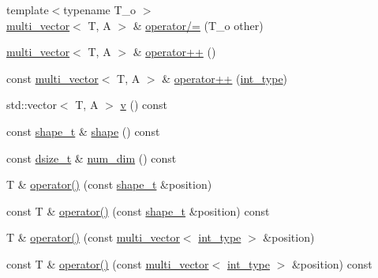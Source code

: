 \begin{DoxyCompactItemize}
\item 
{\footnotesize template$<$typename T\+\_\+o $>$ }\\\hyperlink{classIceBRG_1_1multi__vector}{multi\+\_\+vector}$<$ T, A $>$ \& \hyperlink{classIceBRG_1_1multi__vector_aef3fb151f960eff2cd162b9986229c46}{operator/=} (T\+\_\+o other)
\item 
\hyperlink{classIceBRG_1_1multi__vector}{multi\+\_\+vector}$<$ T, A $>$ \& \hyperlink{classIceBRG_1_1multi__vector_a472689a6e3130c24d066c314bf6a8409}{operator++} ()
\item 
const \hyperlink{classIceBRG_1_1multi__vector}{multi\+\_\+vector}$<$ T, A $>$ \& \hyperlink{classIceBRG_1_1multi__vector_adc1298f6bfb1b3d47bb6cb23230ca527}{operator++} (\hyperlink{lib_2IceBRG__main_2common_8h_ac4de9d9335536ac22821171deec8d39e}{int\+\_\+type})
\item 
std\+::vector$<$ T, A $>$ \hyperlink{classIceBRG_1_1multi__vector_a91f5eebc48c8849b8c27e7992e17701b}{v} () const 
\item 
const \hyperlink{classIceBRG_1_1multi__vector_a468a7f934274e7aa75e01c94ac58f3ea}{shape\+\_\+t} \& \hyperlink{classIceBRG_1_1multi__vector_ad5fb113982dce9456f724ca9072e42c9}{shape} () const 
\item 
const \hyperlink{classIceBRG_1_1multi__vector_af2666369daa5e69abfbadbe365c200e9}{dsize\+\_\+t} \& \hyperlink{classIceBRG_1_1multi__vector_a0beaee05722b4fd40af1452d452f4fe7}{num\+\_\+dim} () const 
\item 
T \& \hyperlink{classIceBRG_1_1multi__vector_a58de7745b168b4831cb1f0b20d933684}{operator()} (const \hyperlink{classIceBRG_1_1multi__vector_a468a7f934274e7aa75e01c94ac58f3ea}{shape\+\_\+t} \&position)
\item 
const T \& \hyperlink{classIceBRG_1_1multi__vector_a472ebe4b4a132452caf3cd98edb64e2c}{operator()} (const \hyperlink{classIceBRG_1_1multi__vector_a468a7f934274e7aa75e01c94ac58f3ea}{shape\+\_\+t} \&position) const 
\item 
T \& \hyperlink{classIceBRG_1_1multi__vector_aad5f4f2ced67278183d44ff906f3b654}{operator()} (const \hyperlink{classIceBRG_1_1multi__vector}{multi\+\_\+vector}$<$ \hyperlink{lib_2IceBRG__main_2common_8h_ac4de9d9335536ac22821171deec8d39e}{int\+\_\+type} $>$ \&position)
\item 
const T \& \hyperlink{classIceBRG_1_1multi__vector_a61766162e95d0896e9dd45b894cbd0f8}{operator()} (const \hyperlink{classIceBRG_1_1multi__vector}{multi\+\_\+vector}$<$ \hyperlink{lib_2IceBRG__main_2common_8h_ac4de9d9335536ac22821171deec8d39e}{int\+\_\+type} $>$ \&position) const 

\end{DoxyCompactItemize}

